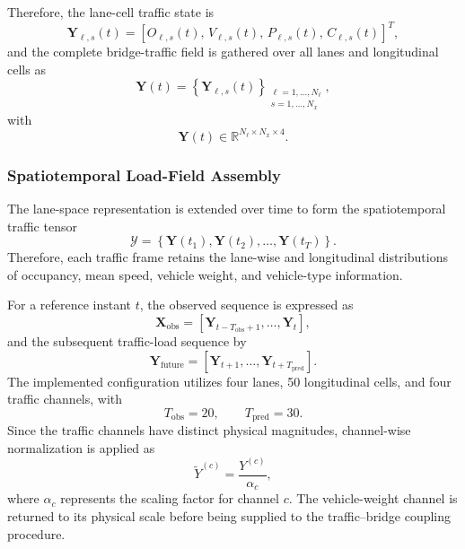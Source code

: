 \documentclass[journal]{IEEEtran}
\newcommand{\mathbfcal}[1]{\boldsymbol{\mathcal{#1}}}
\begin{document}
Therefore, the lane-cell traffic state is
\begin{equation}
\mathbf{Y}_{\ell,s}(t) = \left[O_{\ell,s}(t),\,V_{\ell,s}(t),\,P_{\ell,s}(t),\,C_{\ell,s}(t)\right]^{T},
\label{eq:lane_cell_state}
\end{equation}
and the complete bridge-traffic field is gathered over all lanes and longitudinal cells as
\begin{equation}
\mathbf{Y}(t) = \left\{\mathbf{Y}_{\ell,s}(t)\right\}_{\substack{\ell=1,\ldots,N_{\ell}\\s=1,\ldots,N_x}},
\label{eq:traffic_field}
\end{equation}
with
\begin{equation}
\mathbf{Y}(t)\in\mathbb{R}^{N_{\ell}\times N_x\times 4}.
\label{eq:traffic_field_dimension}
\end{equation}

\subsubsection{Spatiotemporal Load-Field Assembly}
\label{subsec:spatiotemporal_field}

The lane-space representation is extended over time to form the spatiotemporal traffic tensor
\begin{equation}
\mathbfcal{Y} = \left\{\mathbf{Y}(t_1),\mathbf{Y}(t_2),\ldots,\mathbf{Y}(t_T)\right\}.
\label{eq:spatiotemporal_tensor}
\end{equation}
Therefore, each traffic frame retains the lane-wise and longitudinal distributions of occupancy, mean speed, vehicle weight, and vehicle-type information.

For a reference instant $t$, the observed sequence is expressed as
\begin{equation}
\mathbf{X}_{\mathrm{obs}} = \left[\mathbf{Y}_{t-T_{\mathrm{obs}}+1},\ldots,\mathbf{Y}_{t}\right],
\label{eq:observed_sequence}
\end{equation}
and the subsequent traffic-load sequence by
\begin{equation}
\mathbf{Y}_{\mathrm{future}} = \left[\mathbf{Y}_{t+1},\ldots,\mathbf{Y}_{t+T_{\mathrm{pred}}}\right].
\label{eq:future_sequence}
\end{equation}
The implemented configuration utilizes four lanes, 50 longitudinal cells, and four traffic channels, with
\begin{equation}
T_{\mathrm{obs}}=20, \qquad T_{\mathrm{pred}}=30.
\label{eq:sequence_lengths}
\end{equation}
Since the traffic channels have distinct physical magnitudes, channel-wise normalization is applied as
\begin{equation}
\widetilde{Y}^{(c)} = \frac{Y^{(c)}}{\alpha_c},
\label{eq:channel_normalization}
\end{equation}
where $\alpha_c$ represents the scaling factor for channel $c$. The vehicle-weight channel is returned to its physical scale before being supplied to the traffic--bridge coupling procedure.
\end{document}
